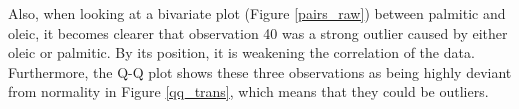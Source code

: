 Also, when looking at a bivariate plot (Figure \ref{pairs_raw}) between palmitic and oleic, it becomes clearer that observation 40 was a strong outlier caused by either oleic or palmitic. By its position, it is weakening the correlation of the data. Furthermore, the Q-Q plot shows these three observations as being highly deviant from normality in Figure \ref{qq_trans}, which means that they could be outliers.

